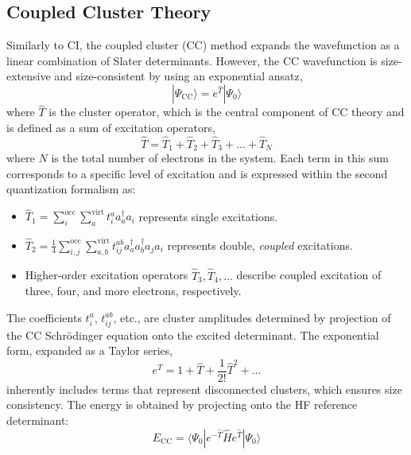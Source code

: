 \subsection{Coupled Cluster Theory} \label{sec:CCTheory}
Similarly to CI, the coupled cluster (CC)\cite{shavitt2009many,vcivzek1966correlation,vcivzek1969use,monkhorst1977calculation,raghavachari1989fifth} method expands the wavefunction as a linear combination of Slater determinants. However, the CC wavefunction is size-extensive and size-consistent by using an exponential ansatz,
\begin{equation}\label{eq:CCWavenfunc}
    | \Psi_{\mathrm{CC}} \rangle = e^{\hat{T}} | \Psi_{0} \rangle
\end{equation}
where $\hat{T}$ is the cluster operator, which is the central component of CC theory and is defined as a sum of excitation operators,
\begin{equation}
    \hat{T} = \hat{T}_1 + \hat{T}_2 + \hat{T}_3 + \dots + \hat{T}_N
\end{equation}
where $N$ is the total number of electrons in the system. Each term in this sum corresponds to a specific level of excitation and is expressed within the second quantization formalism as:
\begin{itemize}
    \item $\hat{T}_1 = \sum_{i}^{\text{occ}} \sum_{a}^{\text{virt}} t_i^a a_a^{\dagger} a_i$ represents single excitations.
    \item $\hat{T}_2 = \frac{1}{4} \sum_{i,j}^{\text{occ}} \sum_{a,b}^{\text{virt}} t_{ij}^{ab} a_a^{\dagger} a_b^{\dagger} a_j a_i$ represents double, \textit{coupled} excitations.
    \item Higher-order excitation operators $\hat{T}_3, \hat{T}_4, \dots$ describe coupled excitation of three, four, and more electrons, respectively.
\end{itemize}
The coefficients $t_i^a$, $t_{ij}^{ab}$, etc., are cluster amplitudes determined by projection of the CC Schr\"{o}dinger equation onto the excited determinant. The exponential form, expanded as a Taylor series,
\begin{equation}
    e^{\hat{T}} = 1 + \hat{T} + \frac{1}{2!} \hat{T}^2 + \dots
\end{equation}
inherently includes terms that represent disconnected clusters, which ensures size consistency. The energy is obtained by projecting onto the HF reference determinant:
\begin{equation}\label{eq:CCEnergy}
    E_{\mathrm{CC}}=\langle \Psi_{0} | e^{-\hat{T}} \hat{H} e^{\hat{T}} | \Psi_{0} \rangle
\end{equation}

